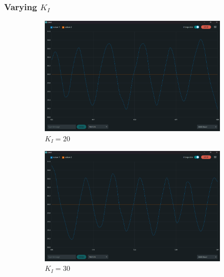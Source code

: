 \documentclass[12pt]{article}
\begin{document}
\subsubsection{Varying $K_I$}

\begin{figure}[h]
    \centering
    \begin{subfigure}{.49\textwidth}
        \centering
        \includegraphics[width=0.95\linewidth]{images/q1/10_20_0.png} 
		\caption{$K_I=20$}
    \end{subfigure}
	\begin{subfigure}{.49\textwidth}
        \centering
        \includegraphics[width=0.95\linewidth]{images/q1/10_30_0.png}
		\caption{$K_I=30$}
    \end{subfigure}
    \begin{subfigure}{.49\textwidth}

\end{subfigure}
\end{figure}
\end{document}
